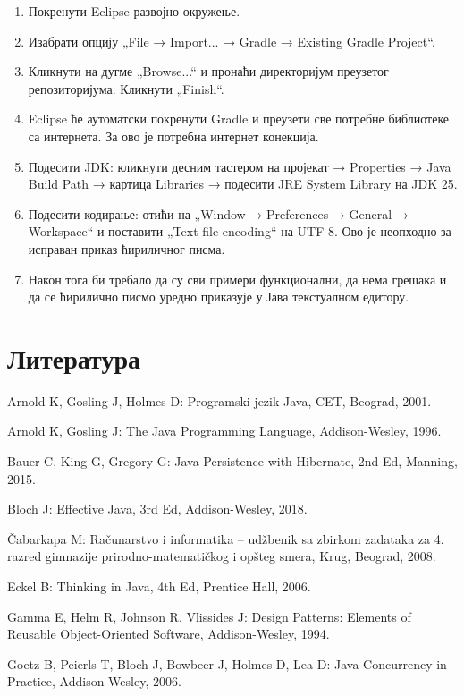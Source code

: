 \begin{enumerate}
\item Покренути Eclipse развојно окружење.
\item Изабрати опцију „File → Import... → Gradle → Existing Gradle Project“.
\item Кликнути на дугме „Browse...“ и пронаћи директоријум преузетог репозиторијума. Кликнути „Finish“.
\item Eclipse ће аутоматски покренути Gradle и преузети све потребне библиотеке са интернета. За ово је потребна интернет конекција.
\item Подесити JDK: кликнути десним тастером на пројекат → Properties → Java Build Path → картица Libraries → подесити JRE System Library на JDK 25.
\item Подесити кодирање: отићи на „Window → Preferences → General → Workspace“ и поставити „Text file encoding“ на UTF-8. Ово је неопходно за исправан приказ ћириличног писма.
\item Након тога би требало да су сви примери функционални, да нема грешака и да се ћирилично писмо уредно приказује у Јава текстуалном едитору.
\end{enumerate}


\chapter*{Литература}
\pagestyle{empty}
\thispagestyle{empty}
\setlength{\parindent}{0pt}
\setlength{\parskip}{4pt}


Arnold K, Gosling J, Holmes D: Programski jezik Java, CET, Beograd, 2001.

Arnold K, Gosling J: The Java Programming Language, Addison-Wesley, 1996.

Bauer C, King G, Gregory G: Java Persistence with Hibernate, 2nd Ed, Manning, 2015.

Bloch J: Effective Java, 3rd Ed, Addison-Wesley, 2018.

Čabarkapa M: Računarstvo i informatika – udžbenik sa zbirkom zadataka za 4. razred gimnazije prirodno-matematičkog i opšteg smera, Krug, Beograd, 2008.

Eckel B: Thinking in Java, 4th Ed, Prentice Hall, 2006.

Gamma E, Helm R, Johnson R, Vlissides J: Design Patterns: Elements of Reusable Object-Oriented Software, Addison-Wesley, 1994.

Goetz B, Peierls T, Bloch J, Bowbeer J, Holmes D, Lea D: Java Concurrency in Practice, Addison-Wesley, 2006.

